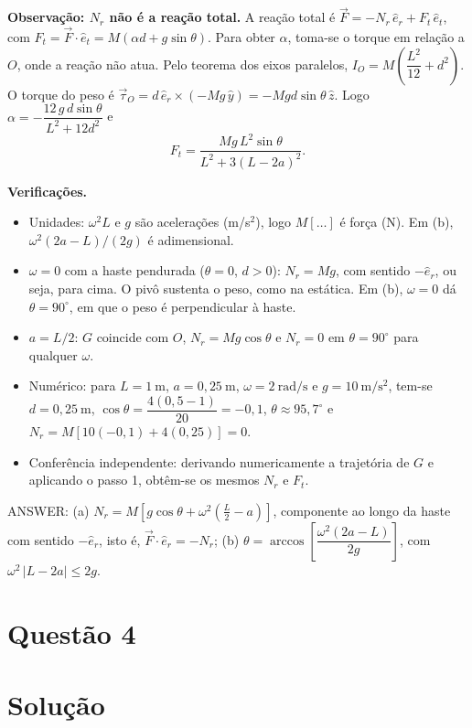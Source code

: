 \documentclass{article}%
\begin{document}
\textbf{Observação: $N_r$ não é a reação total.} A reação total é $\vec F=-N_r\,\hat e_r+F_t\,\hat e_t$, com $F_t=\vec F\cdot\hat e_t=M(\alpha d+g\sin\theta)$. Para obter $\alpha$, toma-se o torque em relação a $O$, onde a reação não atua. Pelo teorema dos eixos paralelos, $I_O=M\left(\dfrac{L^2}{12}+d^2\right)$. O torque do peso é $\vec\tau_O=d\,\hat e_r\times(-Mg\,\hat y)=-Mgd\sin\theta\,\hat z$. Logo $\alpha=-\dfrac{12\,g\,d\sin\theta}{L^2+12d^2}$ e
\[
F_t=\frac{Mg\,L^2\sin\theta}{L^2+3(L-2a)^2}.
\]

\textbf{Verificações.}
\begin{itemize}
\item Unidades: $\omega^2 L$ e $g$ são acelerações (m/s$^2$), logo $M[\ldots]$ é força (N). Em (b), $\omega^2(2a-L)/(2g)$ é adimensional.
\item $\omega=0$ com a haste pendurada ($\theta=0$, $d>0$): $N_r=Mg$, com sentido $-\hat e_r$, ou seja, para cima. O pivô sustenta o peso, como na estática. Em (b), $\omega=0$ dá $\theta=90^\circ$, em que o peso é perpendicular à haste.
\item $a=L/2$: $G$ coincide com $O$, $N_r=Mg\cos\theta$ e $N_r=0$ em $\theta=90^\circ$ para qualquer $\omega$.
\item Numérico: para $L=1\ \mathrm{m}$, $a=0,25\ \mathrm{m}$, $\omega=2\ \mathrm{rad/s}$ e $g=10\ \mathrm{m/s^2}$, tem-se $d=0,25\ \mathrm{m}$, $\cos\theta=\dfrac{4(0,5-1)}{20}=-0,1$, $\theta\approx 95,7^\circ$ e $N_r=M[10(-0,1)+4(0,25)]=0$.
\item Conferência independente: derivando numericamente a trajetória de $G$ e aplicando o passo 1, obtêm-se os mesmos $N_r$ e $F_t$.
\end{itemize}

ANSWER: (a) $N_r=M\left[g\cos\theta+\omega^2\left(\frac{L}{2}-a\right)\right]$, componente ao longo da haste com sentido $-\hat e_r$, isto é, $\vec F\cdot\hat e_r=-N_r$; (b) $\theta=\arccos\left[\dfrac{\omega^2(2a-L)}{2g}\right]$, com $\omega^2\,|L-2a|\le 2g$.%
\newpage%
\section*{Questão 4}

\section*{Solução}
\end{document}
